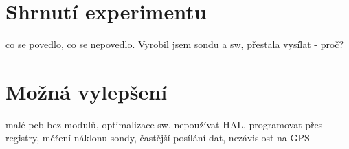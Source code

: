 \documentclass[twoside]{ctuthesis}
\theoremstyle{plain}
\theoremstyle{definition}
\theoremstyle{note}
\begin{document}
	\section{Shrnutí experimentu}
	co se povedlo, co se nepovedlo. Vyrobil jsem sondu a sw, přestala vysílat - proč? 

	\section{Možná vylepšení}
	malé pcb bez modulů, optimalizace sw, nepoužívat HAL, programovat přes registry, měření náklonu sondy, častější posílání dat, nezávislost na GPS




\appendix

\printindex

\appendix




\end{document}
